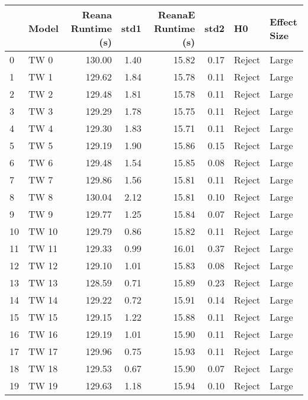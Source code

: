 \begin{tabular}{llrrrrll}
\toprule
{} &  Model &  Reana Runtime (s) &  std1 &  ReanaE Runtime (s) &  std2 &      H0 & Effect Size \\
\midrule
0  &   TW 0 &             130.00 &  1.40 &               15.82 &  0.17 &  Reject &       Large \\
1  &   TW 1 &             129.62 &  1.84 &               15.78 &  0.11 &  Reject &       Large \\
2  &   TW 2 &             129.48 &  1.81 &               15.78 &  0.11 &  Reject &       Large \\
3  &   TW 3 &             129.29 &  1.78 &               15.75 &  0.11 &  Reject &       Large \\
4  &   TW 4 &             129.30 &  1.83 &               15.71 &  0.11 &  Reject &       Large \\
5  &   TW 5 &             129.19 &  1.90 &               15.86 &  0.15 &  Reject &       Large \\
6  &   TW 6 &             129.48 &  1.54 &               15.85 &  0.08 &  Reject &       Large \\
7  &   TW 7 &             129.86 &  1.56 &               15.81 &  0.11 &  Reject &       Large \\
8  &   TW 8 &             130.04 &  2.12 &               15.81 &  0.10 &  Reject &       Large \\
9  &   TW 9 &             129.77 &  1.25 &               15.84 &  0.07 &  Reject &       Large \\
10 &  TW 10 &             129.79 &  0.86 &               15.82 &  0.11 &  Reject &       Large \\
11 &  TW 11 &             129.33 &  0.99 &               16.01 &  0.37 &  Reject &       Large \\
12 &  TW 12 &             129.10 &  1.01 &               15.83 &  0.08 &  Reject &       Large \\
13 &  TW 13 &             128.59 &  0.71 &               15.89 &  0.23 &  Reject &       Large \\
14 &  TW 14 &             129.22 &  0.72 &               15.91 &  0.14 &  Reject &       Large \\
15 &  TW 15 &             129.15 &  1.22 &               15.88 &  0.11 &  Reject &       Large \\
16 &  TW 16 &             129.19 &  1.01 &               15.90 &  0.11 &  Reject &       Large \\
17 &  TW 17 &             129.96 &  0.75 &               15.93 &  0.11 &  Reject &       Large \\
18 &  TW 18 &             129.53 &  0.67 &               15.90 &  0.07 &  Reject &       Large \\
19 &  TW 19 &             129.63 &  1.18 &               15.94 &  0.10 &  Reject &       Large \\
\bottomrule
\end{tabular}
